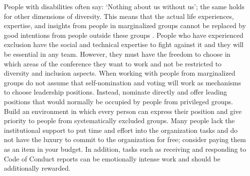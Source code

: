 \documentclass[10pt,letterpaper]{article}
\begin{document}
People with disabilities often say: `Nothing about us without us'; the same holds for other dimensions of diversity. This means that the actual life experiences, expertise, and insights from people in marginalized groups cannot be replaced by good intentions from people outside these groups \cite{costanzachockDesign2020}.
People who have experienced exclusion have the social and technical expertise to fight against it and they will be essential in any team.
However, they must have the freedom to choose in which areas of the conference they want to work and not be restricted to diversity and inclusion aspects. 
When working with people from marginalized groups do not assume that self-nomination and voting will work as mechanisms to choose leadership positions. Instead, nominate directly and offer leading positions that would normally be occupied by people from privileged groups.
Build an environment in which every person can express their position and give priority to people from systematically excluded groups.
Many people lack the institutional support to put time and effort into the organization tasks and do not have the luxury to commit to the organization for free; consider paying them as an item in your budget.  
In addition, tasks such as receiving and responding to Code of Conduct reports can be emotionally intense work and should be additionally rewarded.

\end{document}
